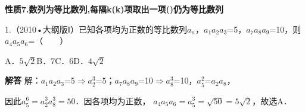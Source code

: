 \par\medskip\noindent\textbf{性质7.数列为等比数列,每隔k(k)项取出一项()仍为等比数列}\par
{}
1.（2010•大纲版Ⅰ）已知各项均为正数的等比数列{\ensuremath{a_{n}}}，\ensuremath{a_{1}}\ensuremath{a_{2}}\ensuremath{a_{3}}=5，\ensuremath{a_{7}}\ensuremath{a_{8}}\ensuremath{a_{9}}=10，则\ensuremath{a_{4}}\ensuremath{a_{5}}\ensuremath{a_{6}}=（　　）\par
\qquad{}\qquad{}\qquad{}A．$5\sqrt2$\qquad{}B．7\qquad{}C．6\qquad{}D．$4\sqrt2$\qquad{}\par
\QuestionSpace{1.2cm}
\ifshowanswers
\par\begingroup\color{solutioncolor}\noindent\textbf{解答}\quad
解：\ensuremath{a_{1}}\ensuremath{a_{2}}\ensuremath{a_{3}}=5\ensuremath{\Longrightarrow}\ensuremath{a_{2}^{3}}=5；\ensuremath{a_{7}}\ensuremath{a_{8}}\ensuremath{a_{9}}=10\ensuremath{\Longrightarrow}\ensuremath{a_{8}^{3}}=10，\ensuremath{a_{5}^{2}}=\ensuremath{a_{2}}\ensuremath{a_{8}}，\par
因此$a_5^6=a_2^3a_8^3=50$．因各项均为正数，
$a_4a_5a_6=a_5^3=\sqrt{50}=5\sqrt2$，故选A．\par
\par\endgroup\fi

